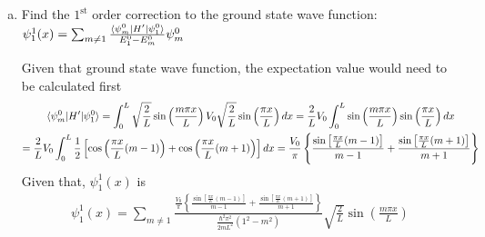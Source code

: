 \documentclass[10pt,letterpaper]{article}
\begin{document}
\begin{enumerate}
\begin{enumerate}[a)]
\color{violet}
At $E_{1}$,
\begin{gather*}
E_{1} \approx E_{1}^{(0)} + E_{1}^{(1)} = \frac{(\num{1.055e-34})^{2}\pi^{2}1^{2}}{2m * (\num{1e-9})^{2}} + \int_{0}^{L} e * \num{1e8} * x dx \\
= \frac{(\num{1.055e-34})^{2}\pi^{2}1^{2}}{2 * \num{9.109e-31} * (\num{1e-9})^{2}} +  \frac{\num{1.602e-19} * \num{1e8} * (\num{1e-9})^{2}}{2} = \num{6.03e-20} \text{ J} = 0.376 \text{ eV}
\end{gather*}
At $E_{2}$,
\begin{gather*}
E_{2} \approx E_{2}^{(0)} + E_{2}^{(1)} = \frac{(\num{1.055e-34})^{2}\pi^{2}2^{2}}{2m * (\num{1e-9})^{2}} + \int_{0}^{L} e * \num{1e8} * x dx \\
= \frac{(\num{1.055e-34})^{2}\pi^{2}2^{2}}{2 * \num{9.109e-31} * (\num{1e-9})^{2}} +  \frac{\num{1.602e-19} * \num{1e8} * (\num{1e-9})^{2}}{2} = \num{2.412e-19} \text{ J} = 1.506 \text{ eV}
\end{gather*}
At $E_{3}$,
\begin{gather*}
E_{3} \approx E_{3}^{(0)} + E_{3}^{(1)} = \frac{(\num{1.055e-34})^{2}\pi^{2}3^{2}}{2m * (\num{1e-9})^{2}} + \int_{0}^{L} e * \num{1e8} * x dx \\
= \frac{(\num{1.055e-34})^{2}\pi^{2}3^{2}}{2 * \num{9.109e-31} * (\num{1e-9})^{2}} +  \frac{\num{1.602e-19} * \num{1e8} * (\num{1e-9})^{2}}{2} = \num{5.427e-19} \text{ J} = 3.388 \text{ eV}
\end{gather*}
\color{black}

\item Find the $1^{\text{st}}$ order correction to the ground state wave function: $\psi_{1}^{1}(x) = \sum_{m \neq 1} \frac{\braket{\psi_{m}^{0} | H' | \psi_{1}^{0}}}{E_{1}^{0} - E_{m}^{0}} \psi_{m}^{0}$

\color{violet}
Given that ground state wave function, the expectation value would need to be calculated first
\begin{gather*}
\braket{\psi_{m}^{0} | H' | \psi_{1}^{0}} = \int_{0}^{L} \sqrt{\frac{2}{L}} \sin\left( \frac{m\pi x}{L} \right) V_{0} \sqrt{\frac{2}{L}} \sin\left( \frac{\pi x}{L} \right) dx = \frac{2}{L} V_{0} \int_{0}^{L} \sin\left( \frac{m\pi x}{L} \right) \sin\left( \frac{\pi x}{L} \right) dx \\
= \frac{2}{L} V_{0} \int_{0}^{L} \frac{1}{2} \left[ \cos \left( \frac{\pi x}{L}(m - 1) \right) + \cos\left( \frac{\pi x}{L}(m + 1) \right) \right]dx = \frac{V_{0}}{\pi} \left\{ \frac{\sin\left[ \frac{\pi x}{L}(m - 1) \right]}{m - 1} + \frac{\sin\left[ \frac{\pi x}{L}(m  + 1) \right]}{m + 1} \right\}
\end{gather*}
Given that, $\psi_{1}^{1}(x)$ is
\begin{gather*}
\psi_{1}^{1}(x) = \sum_{m \neq 1} \frac{\frac{V_{0}}{\pi} \left\{ \frac{\sin\left[ \frac{\pi x}{L}(m - 1) \right]}{m - 1} + \frac{\sin\left[ \frac{\pi x}{L}(m  + 1) \right]}{m + 1} \right\}}{\frac{\hbar^{2}\pi^{2}}{2mL^{2}}(1^{2} - m^{2})}\sqrt{\frac{2}{L}} \sin\left( \frac{m\pi x}{L} \right)
\end{gather*}
\color{black}


\end{enumerate}
\end{enumerate}
\end{document}
